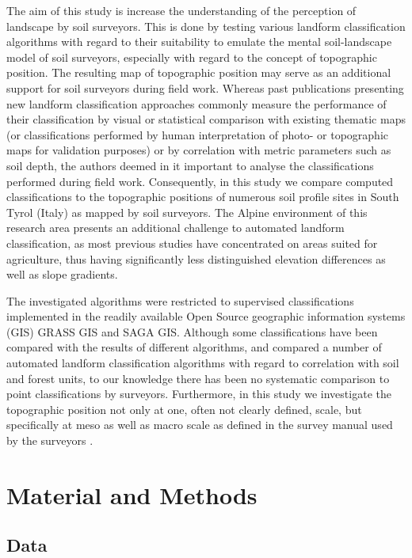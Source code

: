 \documentclass[preprint,12pt,authoryear]{elsarticle}
\begin{document}
The aim of this study is increase the understanding of the perception of landscape by soil surveyors. This is done by testing various landform classification algorithms with regard to their suitability to emulate the mental soil-landscape model of soil surveyors, especially with regard to the concept of topographic position. The resulting map of topographic position may serve as an additional support for soil surveyors during field work. Whereas past publications presenting new landform classification approaches commonly measure the performance of their classification by visual or statistical comparison with existing thematic maps (or classifications performed by human interpretation of photo- or topographic maps for validation purposes) or by correlation with metric parameters such as soil depth, the authors deemed in it important to analyse the classifications performed during field work. Consequently, in this study we compare computed classifications to the topographic positions of numerous soil profile sites in South Tyrol (Italy) as mapped by soil surveyors. The Alpine environment of this research area presents an additional challenge to automated landform classification, as most previous studies have concentrated on areas suited for agriculture, thus having significantly less distinguished elevation differences as well as slope gradients.

The investigated algorithms were restricted to supervised classifications implemented in the readily available Open Source geographic information systems (GIS) GRASS GIS \citep{GRASS_GIS_software} and SAGA GIS\citep{conrad2015system}.  Although some classifications have been compared with the results of different algorithms, and \cite{Barka2011} compared a number of automated landform classification algorithms with regard to correlation with soil and forest units, to our knowledge there has been no systematic comparison to point classifications by surveyors. Furthermore, in this study we investigate the topographic position not only at one, often not clearly defined, scale, but specifically at meso as well as macro scale as defined in the survey manual used by the surveyors \citep{Englisch1998}.

\section{Material and Methods}
\subsection{Data}
\end{document}
